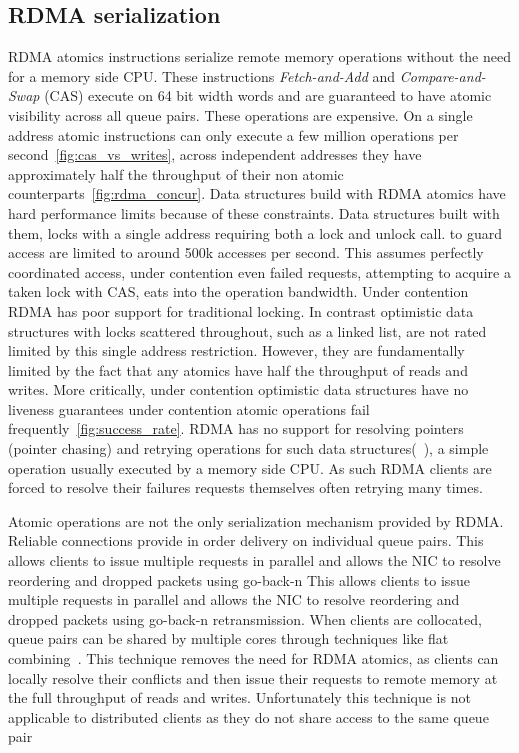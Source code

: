 \subsection{RDMA serialization} RDMA atomics instructions
serialize remote memory operations without the need for a
memory side CPU. These instructions \textit{Fetch-and-Add}
and \textit{Compare-and-Swap} (CAS) execute on 64 bit width
words and are guaranteed to have atomic visibility across
all queue pairs. These operations are expensive. On a single
address atomic instructions can only execute a few million
operations per second~\ref{fig:cas_vs_writes}, across
independent addresses they have approximately half the
throughput of their non atomic
counterparts~\ref{fig:rdma_concur}. 
Data structures build with RDMA atomics have hard
performance limits because of these constraints.  Data
structures built with them, locks with a single address
requiring both a lock and unlock call.  to guard access are
limited to around 500k accesses per second. This assumes
perfectly coordinated access, under contention even failed
requests, attempting to acquire a taken lock with CAS, eats
into the operation bandwidth.  Under contention RDMA has
poor support for traditional locking. In contrast optimistic
data structures with locks scattered throughout, such as a
linked list, are not rated limited by this single address
restriction.  However, they are fundamentally limited by the
fact that any atomics have half the throughput of reads and
writes. More critically, under contention optimistic data
structures have no liveness guarantees under contention
atomic operations fail frequently~\ref{fig:success_rate}.
RDMA has no support for resolving pointers (pointer chasing)
and retrying operations for such data
structures(~\cite{rma}), a simple operation usually executed
by a memory side CPU. As such RDMA clients are forced to
resolve their failures requests themselves often retrying
many times.

Atomic operations are not the only serialization mechanism
provided by RDMA. Reliable connections provide in order
delivery on individual queue pairs. This allows clients to
issue multiple requests in parallel and allows the NIC to
resolve reordering and dropped packets using go-back-n This
allows clients to issue multiple requests in parallel and
allows the NIC to resolve reordering and dropped packets
using go-back-n retransmission. When clients are collocated,
queue pairs can be shared by multiple cores through
techniques like flat combining~\cite{flock,sherman}. This
technique removes the need for RDMA atomics, as clients can
locally resolve their conflicts and then issue their
requests to remote memory at the full throughput of reads
and writes. Unfortunately this technique is not applicable
to distributed clients as they do not share access to the
same queue pair


